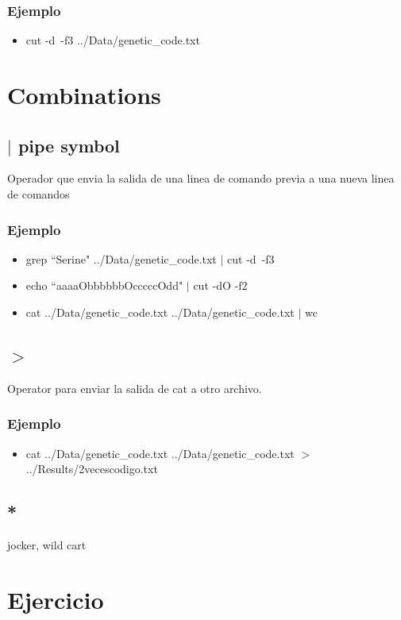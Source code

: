 \documentclass[10pt]{article}
\begin{document}
\subsubsection{Ejemplo}
\begin{itemize}
\item cut -d\, -f3 ../Data/genetic\_code.txt
\end{itemize}

\section{Combinations}

\subsection{$|$ pipe symbol}
Operador que envia la salida de una linea de comando previa a una nueva linea de comandos

\subsubsection{Ejemplo}
\begin{itemize}
\item grep ``Serine" ../Data/genetic\_code.txt $|$ cut -d\, -f3
\item echo ``aaaaObbbbbbOcccccOdd" $|$ cut -dO -f2
\item cat ../Data/genetic\_code.txt ../Data/genetic\_code.txt $|$ wc
\end{itemize}
\subsection{$>$}
Operator para enviar la salida de cat a otro archivo.
\subsubsection{Ejemplo}
\begin{itemize}
\item cat ../Data/genetic\_code.txt ../Data/genetic\_code.txt $>$ ../Results/2vecescodigo.txt
\end{itemize}

\subsection{*}

jocker, wild cart 

\section{Ejercicio}
\end{document}
